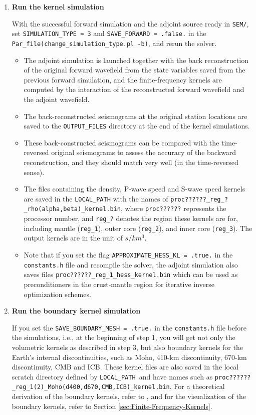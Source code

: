 \documentclass[oneside,english]{book}
\begin{document}
\begin{enumerate}
\item \textbf{Run the kernel simulation}


With the successful forward simulation and the adjoint source ready
in \texttt{SEM/}, set \texttt{SIMULATION\_TYPE = 3} and \texttt{SAVE\_FORWARD
= .false.} in the \texttt{Par\_file(change\_simulation\_type.pl -b)},
and rerun the solver.

\begin{itemize}
\item The adjoint simulation is launched together with the back reconstruction
of the original forward wavefield from the state variables saved from
the previous forward simulation, and the finite-frequency kernels
are computed by the interaction of the reconstructed forward wavefield
and the adjoint wavefield.
\item The back-reconstructed seismograms at the original station locations
are saved to the \texttt{OUTPUT\_FILES} directory at the end of the
kernel simulations.
\item These back-constructed seismograms can be compared with the time-reversed
original seismograms to assess the accuracy of the backward reconstruction,
and they should match very well (in the time-reversed sense).
\item The files containing the density, P-wave speed and S-wave speed kernels
are saved in the \texttt{LOCAL\_PATH} with the names of \texttt{proc??????\_reg\_?\_rho(alpha,beta)\_kernel.bin},
where \texttt{proc??????} represents the processor number, and \texttt{reg\_?}
denotes the region these kernels are for, including mantle (\texttt{reg\_1}),
outer core (\texttt{reg\_2}), and inner core (\texttt{reg\_3}). The
output kernels are in the unit of $s/km^{3}$.
\item Note that if you set the flag \texttt{APPROXIMATE\_HESS\_KL = .true.} in
the \texttt{constants.h} file and recompile the solver, the adjoint simulation
also saves files \texttt{proc??????\_reg\_1\_hess\_kernel.bin} which can
be used as preconditioners in the crust-mantle region for iterative inverse
optimization schemes.
\end{itemize}
\item \textbf{Run the boundary kernel simulation}


\noindent If you set the \texttt{SAVE\_BOUNDARY\_MESH = .true.} in
the \texttt{constants.h} file before the simulations, i.e., at the
beginning of step 1, you will get not only the volumetric kernels
as described in step 3, but also boundary kernels for the Earth's
internal discontinuities, such as Moho, 410-km discontinuity, 670-km
discontinuity, CMB and ICB. These kernel files are also saved in the
local scratch directory defined by \texttt{LOCAL\_PATH }and have names
such as \texttt{proc??????\_reg\_1(2)\_Moho(d400,d670,CMB,ICB)\_kernel.bin}.
For a theoretical derivation of the boundary kernels, refer to \citet{TrTaLi05},
and for the visualization of the boundary kernels, refer to Section
\ref{sec:Finite-Frequency-Kernels}.


\end{enumerate}
\end{document}
